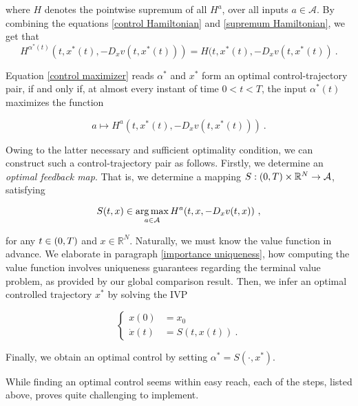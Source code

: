 where $ H $ denotes the pointwise supremum of all $ H^{a} $, over all inputs $ a \in \mathcal{A} $. By combining the equations \eqref{control Hamiltonian} and \eqref{supremum Hamiltonian}, we get that
\begin{equation}
\label{control maximizer}
	H^{\alpha^{*}(t)}(t, x^{*}(t), -D_x v(t, x^{*}(t))) = H(t, x^{*}(t), -D_x v(t, x^{*}(t)) \ .
\end{equation}

Equation \eqref{control maximizer} reads $ \alpha^* $ and $ x^* $ form an optimal control-trajectory pair, if and only if, at almost every instant of time $ 0 < t < T $, the input $ \alpha^{*}(t) $ maximizes the function

\begin{equation*}
	a \mapsto H^{a}(t, x^{*}(t), -D_x v(t, x^{*}(t))) \ .
\end{equation*}

Owing to the latter necessary and sufficient optimality condition, we can construct such a control-trajectory pair as follows. Firstly, we determine an \emph{optimal feedback map}. That is, we determine a mapping $ S : \left(0, T\right) \times \mathbb{R}^N \to \mathcal{A} $, satisfying

\begin{equation*}
	S(t, x) \in \operatorname*{arg\,max}_{a \in \mathcal{A}} H^{a}(t, x, -D_x v(t, x)) \ ,
\end{equation*}

for any $ t \in \left(0, T\right) $ and $ x \in \mathbb{R}^N $. Naturally, we must know the value function in advance. We elaborate in paragraph \ref{importance uniqueness}, how computing the value function involves uniqueness guarantees regarding the terminal value problem, as provided by our global comparison result. Then, we infer an optimal controlled trajectory $ x^{*} $ by solving the IVP

\begin{equation}
\label{feedback IVP}
	\begin{cases}
	x(0) &= x_0 \\
	\dot{x}(t) &= S(t, x(t)) \ .
	\end{cases}
\end{equation}

Finally, we obtain an optimal control by setting $ \alpha^{*} = S(\cdot, x^{*}) $. 

While finding an optimal control seems within easy reach, each of the steps, listed above, proves quite challenging to implement.

